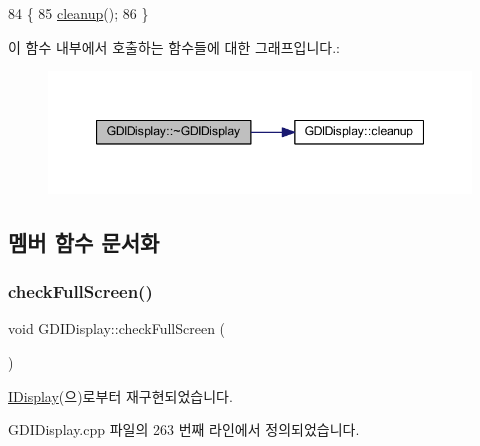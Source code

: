 \begin{DoxyCode}
84 \{
85   \mbox{\hyperlink{class_g_d_i_display_ac1bee01ce5982ad75f5d8883133b0ee9}{cleanup}}();
86 \}
\end{DoxyCode}
이 함수 내부에서 호출하는 함수들에 대한 그래프입니다.\+:
\nopagebreak
\begin{figure}[H]
\begin{center}
\leavevmode
\includegraphics[width=347pt]{class_g_d_i_display_afedb6dc098b7138a2dc311f1b9fd67ed_cgraph}
\end{center}
\end{figure}


\subsection{멤버 함수 문서화}
\mbox{\label{class_g_d_i_display_a515bce84bcfc615fe0bb983f2ce3e20b}} 
\subsubsection{\texorpdfstring{check\+Full\+Screen()}{checkFullScreen()}}
{\footnotesize\ttfamily void G\+D\+I\+Display\+::check\+Full\+Screen (\begin{DoxyParamCaption}{ }\end{DoxyParamCaption})\hspace{0.3cm}{\ttfamily [virtual]}}



\mbox{\hyperlink{class_i_display_afcb9df4a4949d13491f9a07a2ce24eb0}{I\+Display}}(으)로부터 재구현되었습니다.



G\+D\+I\+Display.\+cpp 파일의 263 번째 라인에서 정의되었습니다.


